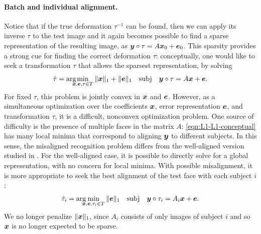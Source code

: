 \paragraph{Batch and individual alignment.} Notice that if the true deformation $\tau^{-1}$ can be found, then we can apply its inverse $\tau$ to the test image and it again becomes possible to find a sparse representation of the resulting image, as ${\boldsymbol{y}} \circ \tau = A {\boldsymbol{x}}_0 + \boldsymbol{e}_0$.  This sparsity provides a strong cue for finding the correct deformation $\tau$: conceptually, one would like to seek a transformation $\tau$ that allows the sparsest representation, by solving\vspace{0mm}
\begin{equation} \label{eqn:L1-L1-conceptual}
\hat{\tau} = \arg\hspace{-2.5mm}\min_{\x,\e,\tau \in T} \| \x \|_1 + \| \e \|_1 \quad \subj \quad \y \circ \tau = A \x + \e. \vspace{0mm}
\end{equation}
For fixed $\tau$, this problem is jointly convex in ${\boldsymbol{x}}$ and $\boldsymbol{e}$. However, as a simultaneous optimization over the coefficients ${\boldsymbol{x}}$, error representation $\boldsymbol{e}$, and transformation $\tau$, it is a difficult, nonconvex optimization problem. One source of difficulty is the presence of multiple faces in the matrix $A$: \eqref{eqn:L1-L1-conceptual} has many local minima that correspond to aligning ${\boldsymbol{y}}$ to different subjects. In this sense, the misaligned recognition problem differs from the well-aligned version studied in \cite{Wright2009-PAMI}. For the well-aligned case, it is possible to directly solve for a global representation, with no concern for local minima. With possible misalignment, it is more appropriate to seek the best alignment of the test face with each subject $i$:\vspace{0mm}
\begin{equation} \label{eqn:per-subject-L1}
\hat \tau_i = \arg\hspace{-2.5mm}\min_{\x,\e,\tau_i \in T} \| \e \|_1 \quad \subj \quad \y \circ \tau_i = A_i \x + \e.\vspace{0mm}
\end{equation}
We no longer penalize $\| {\boldsymbol{x}} \|_1$, since $A_i$ consists of only images of subject $i$ and so ${\boldsymbol{x}}$ is no longer expected to be sparse.\vspace{0mm}

